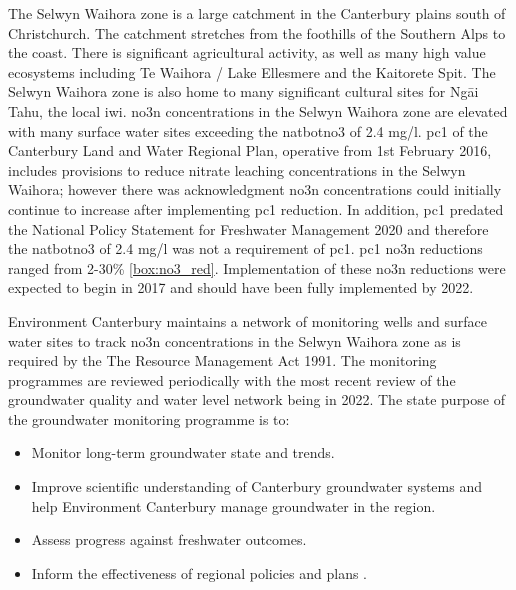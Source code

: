 The Selwyn Waihora zone is a large catchment in the Canterbury plains south of Christchurch.
The catchment stretches from the foothills of the Southern Alps to the coast.
There is significant agricultural activity, as well as many high value ecosystems including Te Waihora / Lake Ellesmere and the Kaitorete Spit.
The Selwyn Waihora zone is also home to many significant cultural sites for Ngāi Tahu, the local iwi.
\gls{no3n} concentrations in the Selwyn Waihora zone are elevated with many surface water sites exceeding the \gls{natbotno3} of 2.4 mg/l\citep{noauthor_national_2020}.
\gls{pc1} of the Canterbury Land and Water Regional Plan, operative from 1st February 2016, includes provisions to reduce nitrate leaching concentrations in the Selwyn Waihora; however there was acknowledgment \gls{no3n} concentrations could initially continue to increase after implementing \gls{pc1} reduction.
In addition, \gls{pc1} predated the National Policy Statement for Freshwater Management 2020 and therefore the \gls{natbotno3} of 2.4 mg/l was not a requirement of \gls{pc1}.
\gls{pc1} \gls{no3n} reductions ranged from 2-30\% \autoref{box:no3_red}.
Implementation of these \gls{no3n} reductions were expected to begin in 2017 and should have been fully implemented by 2022.


Environment Canterbury maintains a network of monitoring wells and surface water sites to track \gls{no3n} concentrations in the Selwyn Waihora zone as is required by the The Resource Management Act 1991.
The monitoring programmes are reviewed periodically with the most recent review of the groundwater quality and water level network being in 2022.
The state purpose of the groundwater monitoring programme is to:
\begin{itemize}
    \item Monitor long-term groundwater state and trends.
    \item Improve scientific understanding of Canterbury groundwater systems and help Environment Canterbury manage groundwater in the region.
    \item Assess progress against freshwater outcomes.
    \item Inform the effectiveness of regional policies and plans \citep{ecan_monitor_review}.
\end{itemize}

